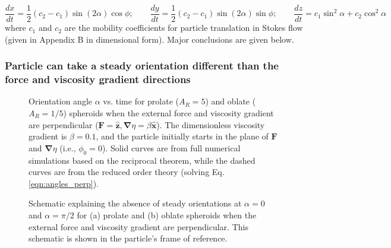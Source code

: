 \documentclass{jfm}
\begin{document}
\begin{equation} \label{eqn:trans_perp}
\frac{dx}{dt} = \frac{1}{2} (c_2- c_1) \sin(2\alpha) \cos\phi; \qquad \frac{dy}{dt} = \frac{1}{2} (c_2- c_1) \sin(2\alpha) \sin\phi; \qquad \frac{dz}{dt} = c_1 \sin^2 \alpha + c_2 \cos^2 \alpha
\end{equation}
where $c_1$ and $c_2$ are the mobility coefficients for particle translation in Stokes flow (given in Appendix B in dimensional form).  Major conclusions are given below.

\subsubsection{Particle can take a steady orientation different than the force and viscosity gradient directions}

\begin{figure}
\centering
{}
\caption{Orientation angle $\alpha$ vs. time for prolate ($A_R =5$) and oblate ($A_R =1/5$) spheroids when the external force and viscosity gradient are perpendicular ($\boldsymbol{F} = \boldsymbol{\hat{z}}, \boldsymbol{\nabla}\eta = \beta \boldsymbol{\hat{x}}$).  The dimensionless viscosity gradient is $\beta =0.1$, and the particle initially starts in the plane of $\boldsymbol{F}$ and $\boldsymbol{\nabla }\eta$ (i.e., $\phi_0 = 0$).  Solid curves are from full numerical simulations based on the reciprocal theorem, while the dashed curves are from the reduced order theory (solving Eq. \eqref{eqn:angles_perp}). }
\label{fig:Orient_Y}
\end{figure}

\begin{figure}
\centering
{}
\hfill
{}

\caption{Schematic explaining the absence of steady orientations at $\alpha =0$ and $\alpha =\pi/2$ for (a) prolate  and (b) oblate spheroids when the external force and viscosity gradient are perpendicular. This schematic is shown in the particle's frame of reference.  }
\label{fig:Schematic_Explanation_2}
\end{figure}
\end{document}
